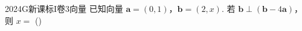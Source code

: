 
\begin{problem}{2024}{G}{新课标I卷}{3}{向量}
已知向量 $\mathbf{a}=(0,1)$，$\mathbf{b}=(2,x)$. 若 $\mathbf{b}\perp(\mathbf{b}-4\mathbf{a})$，则 $x=$
(\hspace{1cm})
\begin{choices}
\end{choices}
\end{problem}
